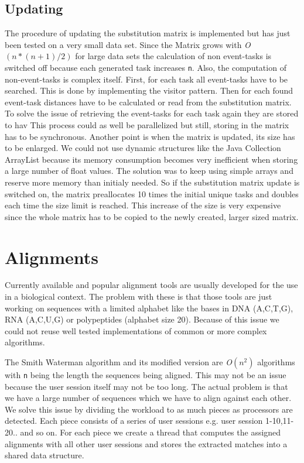 \subsection{Updating}
	The procedure of updating the substitution matrix is implemented but has just been tested on a very small data set. 
	Since the Matrix grows with \textit{O}$(n*(n+1)/2)$ for large data sets the calculation of non event-tasks is switched off because each generated task increases \texttt{n}.
	Also, the computation of non-event-tasks is complex itself. 
	First, for each task all event-tasks have to be searched. This is done by implementing the visitor pattern. 
	Then for each found event-task distances have to be calculated or read from the substitution matrix.
	To solve the issue of retrieving the event-tasks for each task again they are stored to hav
	This process could as well be parallelized but still, storing in the matrix has to be synchronous. 
	Another point is when the matrix is updated, its size has to be enlarged. 
	We could not use dynamic structures like the Java Collection ArrayList because its memory consumption becomes very inefficient when storing a large number of 
	float values. The solution was to keep using simple arrays and reserve more memory than initialy needed.
	So if the substitution matrix update is switched on, the matrix preallocates 10 times the initial unique tasks and doubles each time the size limit is reached.
	This increase of the size is very expensive since the whole matrix has to be copied to the newly created, larger sized matrix.

\section{Alignments}
Currently available and popular alignment tools are usually developed for the use in a biological context. 
The problem with these is that those tools are just working on sequences with a limited alphabet like the bases in DNA (A,C,T,G), RNA (A,C,U,G) or polypeptides (alphabet size 20).
Because of this issue we could not reuse well tested implementations of common or more complex algorithms. 

The Smith Waterman algorithm and its modified version are \textit{O}$(n^2)$ algorithms with \texttt{n} being the length the sequences being aligned.
This may not be an issue because the user session itself may not be too long. 
The actual problem is that we have a large number of sequences which we have to align against each other. 
We solve this issue by dividing the workload to as much pieces as processors are detected. Each piece consists of a series of user sessions e.g. user session 1-10,11-20.. and so on. 
For each piece we create a thread that computes the assigned alignments with all other user sessions and stores the extracted matches into a shared data structure.


